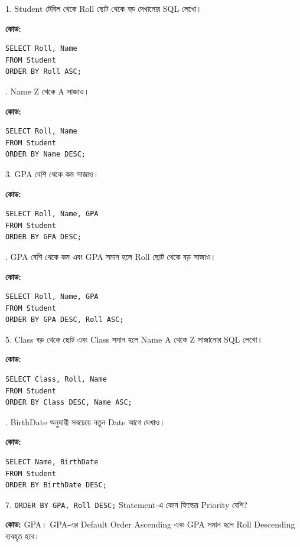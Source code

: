 \begin{chSixSideBySide}[.48]
1. Student টেবিল থেকে Roll ছোট থেকে বড় দেখানোর SQL লেখো।

    \textbf{কোড:}

\begin{verbatim}
SELECT Roll, Name
FROM Student
ORDER BY Roll ASC;
\end{verbatim}
. Name Z থেকে A সাজাও।

    \textbf{কোড:}

\begin{verbatim}
SELECT Roll, Name
FROM Student
ORDER BY Name DESC;
\end{verbatim}
\end{chSixSideBySide}
\begin{chSixSideBySide}[.48]
3. GPA বেশি থেকে কম সাজাও।

    \textbf{কোড:}

\begin{verbatim}
SELECT Roll, Name, GPA
FROM Student
ORDER BY GPA DESC;
\end{verbatim}
. GPA বেশি থেকে কম এবং GPA সমান হলে Roll ছোট থেকে বড় সাজাও।

    \textbf{কোড:}

\begin{verbatim}
SELECT Roll, Name, GPA
FROM Student
ORDER BY GPA DESC, Roll ASC;
\end{verbatim}
\end{chSixSideBySide}
\begin{chSixSideBySide}[.48]
5. Class বড় থেকে ছোট এবং Class সমান হলে Name A থেকে Z
    সাজানোর SQL লেখো।

    \textbf{কোড:}

\begin{verbatim}
SELECT Class, Roll, Name
FROM Student
ORDER BY Class DESC, Name ASC;
\end{verbatim}
. BirthDate অনুযায়ী সবচেয়ে নতুন Date আগে দেখাও।

    \textbf{কোড:}

\begin{verbatim}
SELECT Name, BirthDate
FROM Student
ORDER BY BirthDate DESC;
\end{verbatim}
\end{chSixSideBySide}
7. \texttt{ORDER BY GPA, Roll DESC;} Statement-এ কোন ফিল্ডের
    Priority বেশি?

    \textbf{কোড:}
    GPA। GPA-এর Default Order Ascending এবং GPA সমান হলে
    Roll Descending ব্যবহৃত হবে।

